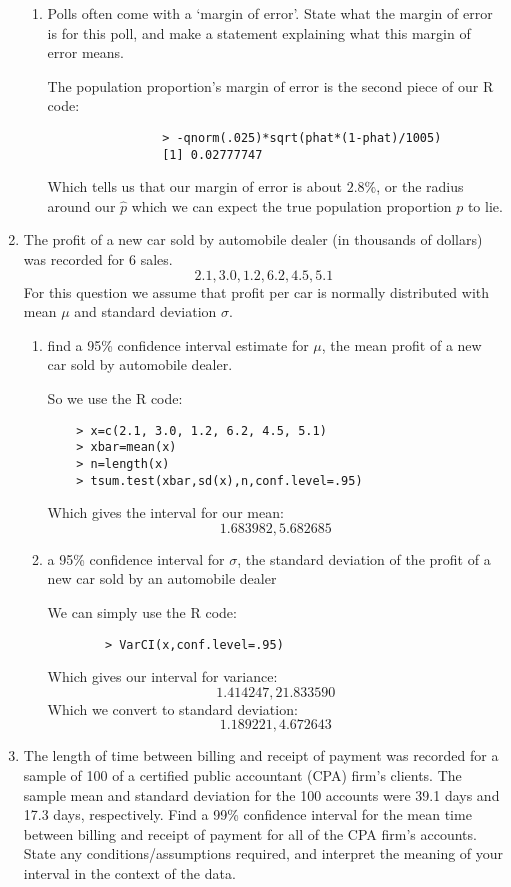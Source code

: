 \documentclass{article}
\begin{document}
\begin{enumerate}
\begin{enumerate}[label= (\alph*)]
        \item  Polls often come with a ‘margin of error’. State what the margin of error is for this
            poll, and make a statement explaining what this margin of error means. 

            The population proportion's margin of error is the second piece of our R code:
            \begin{verbatim}
                > -qnorm(.025)*sqrt(phat*(1-phat)/1005)
                [1] 0.02777747
            \end{verbatim}
            Which tells us that our margin of error is about $2.8\%$, or the radius around our 
            $\hat{p}$ which we can expect the true population proportion $p$ to lie.
    \end{enumerate}

\item The profit of a new car sold by automobile dealer (in thousands of dollars) was recorded for 6 sales.
$$2.1, 3.0, 1.2, 6.2, 4.5, 5.1$$
For this question we assume that profit per car is normally distributed with mean $\mu$ and standard deviation $\sigma$.

\begin{enumerate}[label= (\alph*)] 
\item find a 95\% confidence interval estimate for $\mu$, the mean profit of a new car sold by automobile dealer.

    So we use the R code:
    \begin{verbatim}
    > x=c(2.1, 3.0, 1.2, 6.2, 4.5, 5.1)
    > xbar=mean(x)
    > n=length(x)
    > tsum.test(xbar,sd(x),n,conf.level=.95)
    \end{verbatim}
    Which gives the interval for our mean:
    $$ 1.683982,5.682685$$
\item a 95\% confidence interval for $\sigma$, the standard deviation of the profit of a new car sold by an automobile dealer

    We can simply use the R code: 

    \begin{verbatim}
        > VarCI(x,conf.level=.95)
    \end{verbatim}
    Which gives our interval for variance:
    $$1.414247,21.833590$$
    Which we convert to standard deviation:
    $$1.189221,4.672643$$

\end{enumerate}

\item The length of time between billing and receipt of payment was recorded for a sample of 100 of a certified public accountant (CPA) firm’s clients. The sample mean and standard deviation for the 100 accounts were 39.1 days and 17.3 days, respectively. Find a 99\% confidence interval for the mean time between billing and receipt of payment for all of the CPA firm’s accounts. State any conditions/assumptions required, and interpret the meaning of your interval in the context of the data.


\end{enumerate}
\end{document}
